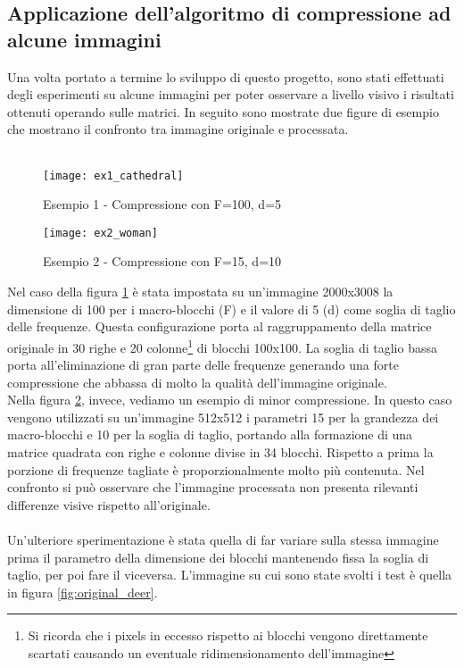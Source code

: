 \subsection{Applicazione dell'algoritmo di compressione ad alcune immagini}
Una volta portato a termine lo sviluppo di questo progetto, sono stati effettuati degli esperimenti su alcune immagini per poter osservare a livello visivo i risultati ottenuti operando sulle matrici. In seguito sono mostrate due figure di esempio che mostrano il confronto tra immagine originale e processata. \\\\
\begin{figure}[H]
    \texttt{[image: ex1\_cathedral]}\centering
    \caption{Esempio 1 - Compressione con F=100, d=5}\label{fig:ex1_cathedral}
\end{figure}

\begin{figure}[H]
    \texttt{[image: ex2\_woman]}\centering
    \caption{Esempio 2 - Compressione con F=15, d=10}\label{fig:ex2_woman}
\end{figure}

Nel caso della figura \ref{fig:ex1_cathedral} è stata impostata su un'immagine 2000x3008 la dimensione di 100 per i macro-blocchi (F) e il valore di 5 (d) come soglia di taglio delle frequenze. Questa configurazione porta al raggruppamento della matrice originale in 30 righe e 20 colonne\footnote{Si ricorda che i pixels in eccesso rispetto ai blocchi vengono direttamente scartati causando un eventuale ridimensionamento dell'immagine} di blocchi 100x100. La soglia di taglio bassa porta all'eliminazione di gran parte delle frequenze generando una forte compressione che abbassa di molto la qualità dell'immagine originale.\\
Nella figura \ref{fig:ex2_woman}, invece, vediamo un esempio di minor compressione. In questo caso vengono utilizzati su un'immagine 512x512 i parametri 15 per la grandezza dei macro-blocchi e 10 per la soglia di taglio, portando alla formazione di una matrice quadrata con righe e colonne divise in 34 blocchi. Rispetto a prima la porzione di frequenze tagliate è proporzionalmente molto più contenuta. Nel confronto si può osservare che l'immagine processata non presenta rilevanti differenze visive rispetto all'originale.\\\\

Un'ulteriore sperimentazione è stata quella di far variare sulla stessa immagine prima il parametro della dimensione dei blocchi mantenendo fissa la soglia di taglio, per poi fare il viceversa. L'immagine su cui sono state svolti i test è quella in figura \ref{fig:original_deer}.\\


